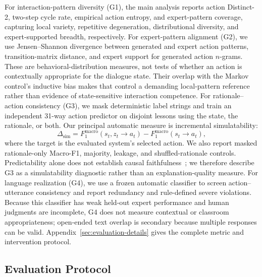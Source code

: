 \documentclass[manuscript,review,anonymous]{acmart}
\begin{document}
For interaction-pattern diversity (G1), the main analysis reports action Distinct-2, two-step cycle rate, empirical action entropy, and expert-pattern coverage, capturing local variety, repetitive degeneration, distributional diversity, and expert-supported breadth, respectively.
For expert-pattern alignment (G2), we use Jensen--Shannon divergence between generated and expert action patterns, transition-matrix distance, and expert support for generated action $n$-grams. These are behavioral-distribution measures, not tests of whether an action is contextually appropriate for the dialogue state. Their overlap with the Markov control's inductive bias makes that control a demanding local-pattern reference rather than evidence of state-sensitive interaction competence.
For rationale--action consistency (G3), we mask deterministic label strings and train an independent 31-way action predictor on disjoint lessons using the state, the rationale, or both.
Our principal automatic measure is incremental simulatability:
\begin{equation}
\Delta_{\mathrm{sim}}
=
F_{1}^{\mathrm{macro}}(s_t,z_t\!\rightarrow\!a_t)
-
F_{1}^{\mathrm{macro}}(s_t\!\rightarrow\!a_t),
\label{eq:g3-simulatability}
\end{equation}
where the target is the evaluated system's selected action.
We also report masked rationale-only Macro-F1, majority, leakage, and shuffled-rationale controls. Predictability alone does not establish causal faithfulness~\citep{hase2020leakage,jacovi2020faithfully}; we therefore describe G3 as a simulatability diagnostic rather than an explanation-quality measure.
For language realization (G4), we use a frozen automatic classifier to screen
action--utterance consistency and report redundancy and rule-defined severe
violations. Because this classifier has weak held-out expert performance and
human judgments are incomplete, G4 does not measure contextual or classroom
appropriateness; open-ended text overlap is secondary because multiple
responses can be valid.
Appendix~\ref{sec:evaluation-details} gives the complete metric and intervention protocol.

\subsection{Evaluation Protocol}
\end{document}
